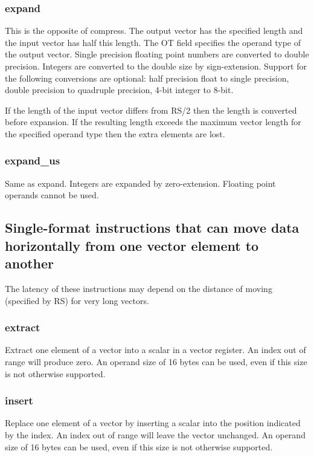 \documentclass[forwardcom.tex]{subfiles}
\begin{document}
\subsubsection{expand}
This is the opposite of compress. The output vector has the specified length and the input vector has half this length. The OT field specifies the operand type of the output vector. Single precision floating point numbers are converted to double precision. Integers are converted to the double size by sign-extension. Support for the following conversions are optional: half precision float to single precision, double precision to quadruple precision, 4-bit integer to 8-bit.
\vspace{2mm}

If the length of the input vector differs from RS/2 then the length is converted before expansion. If the resulting length exceeds the maximum vector length for the specified operand type then the extra elements are lost.

\subsubsection{expand\_us}
Same as expand. Integers are expanded by zero-extension. Floating point operands cannot be used. 


\subsection{Single-format instructions that can move data horizontally from one vector element to another}
The latency of these instructions may depend on the distance of moving (specified by RS) for very long vectors.

\subsubsection{extract}
Extract one element of a vector into a scalar in a vector register. An index out of range will produce zero. An operand size of 16 bytes can be used, even if this size is not otherwise supported.

\subsubsection{insert}
Replace one element of a vector by inserting a scalar into the position indicated by the index. An index out of range will leave the vector unchanged. An operand size of 16 bytes can be used, even if this size is not otherwise supported.
\end{document}
